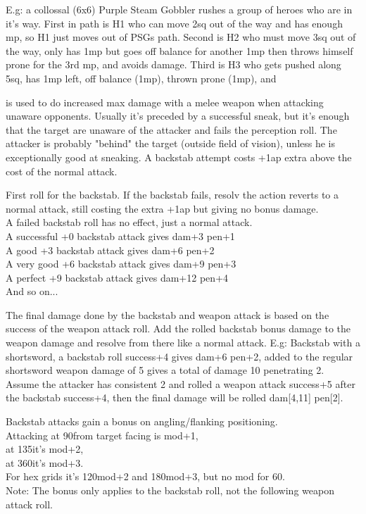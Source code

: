 E.g: a collossal (6x6) Purple Steam Gobbler rushes a group of heroes who are in it's way. First in path is H1 who can move 2sq out of the way and has enough mp, so H1 just moves out of PSGs path. Second is H2 who must move 3sq out of the way, only has 1mp but goes off balance for another 1mp then throws himself prone for the 3rd mp, and avoids damage. Third is H3 who gets pushed along 5sq, has 1mp left, off balance (1mp), thrown prone (1mp), and


 is used to do increased max damage with a melee weapon when attacking unaware opponents. Usually it's preceded by a successful sneak, but it's enough that the target are unaware of the attacker and fails the perception roll. The attacker is probably "behind" the target (outside field of vision), unless he is exceptionally good at sneaking. A backstab attempt costs +1ap extra above the cost of the normal attack.

First roll for the backstab. If the backstab fails, resolv the action reverts to a normal attack, still costing the extra +1ap but giving no bonus damage.\\
A failed backstab roll has no effect, just a normal attack.\\
A successful +0 backstab attack gives dam+3 pen+1 \\
A good +3 backstab attack gives dam+6 pen+2 \\
A very good +6 backstab attack gives dam+9 pen+3 \\
A perfect +9 backstab attack gives dam+12 pen+4 \\
And so on...

The final damage done by the backstab and weapon attack is based on the success of the weapon attack roll. Add the rolled backstab bonus damage to the weapon damage and resolve from there like a normal attack. E.g: Backstab with a shortsword, a backstab roll success+4 gives dam+6 pen+2, added to the regular shortsword weapon damage of 5 gives a total of damage 10 penetrating 2. Assume the attacker has consistent 2 and rolled a weapon attack success+5 after the backstab success+4, then the final damage will be rolled dam[4,11] pen[2].

Backstab attacks gain a bonus on angling/flanking positioning. \\
Attacking at 90\degrees from target facing is mod+1, \\
at 135\degrees it's mod+2, \\
at 360\degrees it's mod+3. \\
For hex grids it's 120\degrees mod+2 and 180\degrees mod+3, but no mod for 60\degree. \\
Note: The bonus only applies to the backstab roll, not the following weapon attack roll.

